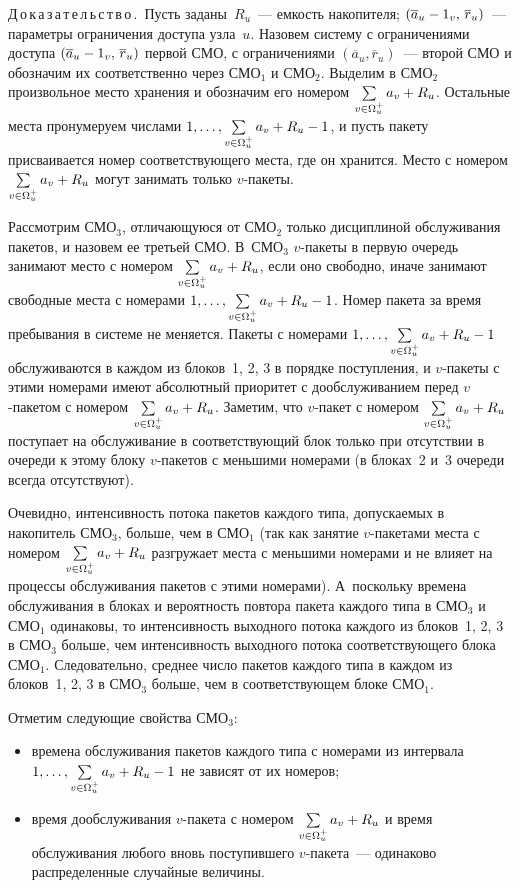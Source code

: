 \begin{multicols}{2}
     \noindent
     Д\,о\,к\,а\,з\,а\,т\,е\,л\,ь\,с\,т\,в\,о\,.\ Пусть заданы~$R_u$~--- емкость 
накопителя; $(\overline{a}_u\hm-1_v,\,\overline{r}_u)$~--- параметры 
ограничения доступа узла~$u$. Назовем систему с ограничениями доступа 
$(\overline{a}_u\hm-1_v,\,\overline{r}_u)$ первой СМО, с ограничениями 
$(\overline{a}_u, \overline{r}_u)$~--- второй СМО и обозначим их 
соответственно через СМО$_1$ и СМО$_2$. Выделим в СМО$_2$ 
произвольное место хранения и обозначим его номером 
$\sum\limits_{v\in\Omega_u^+}a_v\hm+R_u$. Остальные места пронумеруем 
числами $1,\ldots , \sum\limits_{v\in\Omega_u^+}a_v\hm+R_u\hm-1$, и пусть 
пакету присваивается номер соответствующего места, где он хранится. 
Место с номером  $\sum\limits_{v\in\Omega_u^+}a_v\hm+R_u$ могут 
занимать только $v$-пакеты. 
     
     Рассмотрим СМО$_3$, отличающуюся от СМО$_2$ только дисциплиной 
обслуживания пакетов, и назовем ее третьей СМО. В~СМО$_3$ $v$-пакеты в 
первую очередь занимают место с номером 
$\sum\limits_{v\in\Omega_u^+}a_v\hm+R_u$, если оно свободно, иначе 
занимают свободные места с номерами $1,\ldots , 
\sum\limits_{v\in\Omega_u^+}a_v\hm+R_u\hm-1$. Номер пакета за время 
пребывания в системе не меняется. Пакеты с номерами $1,\ldots , 
\sum\limits_{v\in\Omega_u^+}a_v\hm+R_u\hm-1$ обслуживаются в каждом из 
блоков~1, 2, 3 в порядке поступления, и $v$-пакеты с этими номерами имеют 
абсолютный приоритет с дообслуживанием перед $v$-пакетом с номером 
$\sum\limits_{v\in\Omega_u^+}a_v\hm+R_u$. Заметим, что $v$-пакет с 
номером $\sum\limits_{v\in\Omega_u^+}a_v\hm+R_u$ поступает на 
обслуживание в соответствующий блок только при отсутствии в очереди к 
этому блоку $v$-пакетов с меньшими номерами (в блоках~2 и~3 очереди 
всегда отсутствуют).
     
     Очевидно, интенсивность потока пакетов каж\-до\-го типа, допускаемых в 
накопитель СМО$_3$, больше, чем в СМО$_1$ (так как занятие $v$-пакетами 
места с номером $\sum\limits_{v\in\Omega_u^+}a_v\hm+R_u$ разгружает 
места с меньшими номерами и не влияет на процессы обслуживания пакетов 
с этими номерами). А~поскольку времена обслуживания в блоках и 
вероятность повтора пакета каждого типа в СМО$_3$ и СМО$_1$ одинаковы, 
то интенсивность выходного потока каждого из блоков~1, 2, 3 в СМО$_3$ 
больше, чем интенсивность выходного потока соответствующего блока 
СМО$_1$. Следовательно, среднее число пакетов каж\-до\-го типа в каждом из 
блоков~1, 2, 3 в СМО$_3$ больше, чем в соответствующем блоке СМО$_1$.
     
     Отметим следующие свойства СМО$_3$:
     \begin{itemize}
\item времена обслуживания пакетов каждого типа с номерами из интервала 
$1,\ldots , \sum\limits_{v\in\Omega_u^+}a_v\hm+R_u\hm-1$ не зависят от их 
номеров;
\item время дообслуживания $v$-пакета с номером 
$\sum\limits_{v\in\Omega_u^+}a_v\hm+R_u$ и время обслуживания 
любого вновь поступившего $v$-пакета~--- одинаково распределенные 
случайные величины.
     \end{itemize}
     

\end{multicols}
